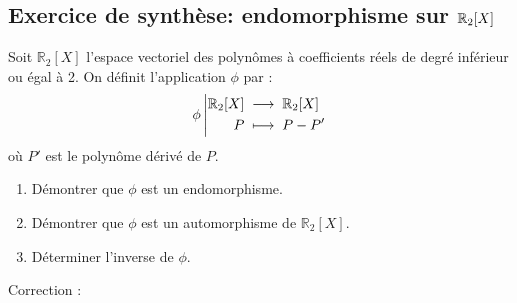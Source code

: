 \documentclass{book}
\begin{document}
\subsection{Exercice de synthèse: endomorphisme sur $\mathbb{R} _2[X]$}
Soit $\mathbb R_2[X]$ l'espace vectoriel des polynômes à coefficients réels de degré inférieur ou égal à 2.
On définit l'application $\phi$ par : 
$$
{\phi}\left|\begin{aligned}{\mathbb{R}_2[X]}&\;\longrightarrow\;{\mathbb{R} _2[X]}\\{P}&\;\longmapsto\;{P-P'}\end{aligned}\right.
$$ où $P'$ est le polynôme dérivé de $P$.
\begin{enumerate}
\item Démontrer que $\phi$ est un endomorphisme. 
\item  Démontrer que $\phi$ est un automorphisme de $\mathbb R_2[X]$.
\item Déterminer l'inverse de $\phi$.
\end{enumerate}
Correction :
\end{document}
